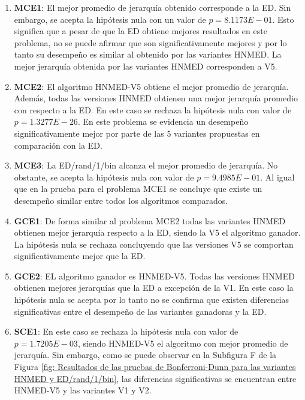 \begin{enumerate}
	\item \textbf{MCE1}: El mejor promedio de jerarquía obtenido corresponde a la ED. Sin embargo, se acepta la hipótesis nula con un valor de $p=8.1173E-01$. Esto significa que a pesar de que la ED obtiene mejores resultados en este problema,  no se puede afirmar que son significativamente mejores y por lo tanto su desempeño es similar al obtenido por las variantes HNMED. La mejor jerarquía obtenida por las variantes HNMED corresponden a V5.
	\item \textbf{MCE2}: El algoritmo HNMED-V5  obtiene el mejor promedio de jerarquía. Además, todas las versiones HNMED obtienen una mejor jerarquía promedio con respecto a la ED. En este caso se rechaza la hipótesis nula con valor de $p=1.3277E-26$. En este problema se evidencia un desempeño significativamente mejor por parte de las 5 variantes propuestas en comparación con la ED.
	
	\item \textbf{MCE3}: La ED/rand/1/bin alcanza el mejor promedio de jerarquía. No obstante, se acepta la hipótesis nula con valor de $p=9.4985E-01$. Al igual que en la prueba para el problema MCE1 se concluye que existe un desempeño similar entre todos los algoritmos comparados.
	
	\item \textbf{GCE1}: De forma similar al problema MCE2 todas las variantes HNMED obtienen mejor jerarquía respecto a la ED, siendo la V5 el algoritmo ganador. La hipótesis nula se rechaza concluyendo que las versiones V5 se comportan significativamente mejor que la ED.
	
	\item \textbf{GCE2}: EL algoritmo ganador es HNMED-V5. Todas las versiones HNMED obtienen mejores jerarquías que la ED  a excepción de la V1. En este caso la hipótesis nula se acepta por lo tanto no se confirma que existen diferencias significativas entre el desempeño de las variantes ganadoras y la ED. 
	
	\item \textbf{SCE1}: En este caso se rechaza la hipótesis nula con valor de $p=1.7205E-03$, siendo HNMED-V5 el algoritmo con mejor promedio de jerarquía. Sin embargo, como se puede observar en la Subfigura F de la Figura \ref{fig: Resultados de las pruebas de Bonferroni-Dunn  para las variantes HNMED y ED/rand/1/bin}, las diferencias significativas se encuentran entre HNMED-V5 y las variantes V1 y V2.  
	 
\end{enumerate}
